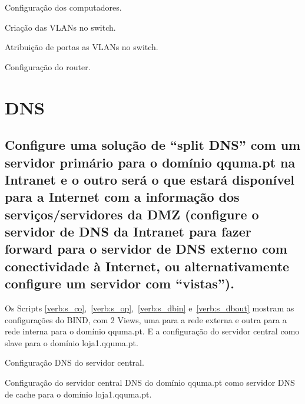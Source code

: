 \documentclass[a4paper,12pt]{article}
\begin{document}
\begin{program}
   
   \caption{Configuração dos computadores.}
   \label{verb:gnus}
\end{program}

\begin{program}
   
   \caption{Criação das VLANs no switch.}
   \label{verb:swicth_vlan}
\end{program}

\begin{program}
   
   \caption{Atribuição de portas as VLANs no switch.}
   \label{verb:switch_ports}
\end{program}

\begin{program}
   
   \caption{Configuração do router.}
   \label{verb:router}
\end{program}

\section{DNS}
\subsection{Configure uma solução de “split DNS” com um servidor primário para o
domínio qquma.pt na Intranet e o outro será o que estará disponível para a
Internet com a informação dos serviços/servidores da DMZ (configure o
servidor de DNS da Intranet para fazer forward para o servidor de DNS
externo com conectividade à Internet, ou alternativamente configure um
servidor com “vistas”).}

Os Scripts \ref{verb:s_co},~\ref{verb:s_op},~\ref{verb:s_dbin} e~\ref{verb:s_dbout}
mostram as configurações do BIND, com 2 Views, uma para a rede externa e outra para a rede interna para o domínio qquma.pt. E a configuração do servidor central como slave para o domínio loja1.qquma.pt.

\begin{program}
   
   \caption{Configuração DNS do servidor central.}
   \label{verb:s_co}
\end{program}

\begin{program}
   
   \caption{Configuração do servidor central DNS do domínio qquma.pt como servidor DNS de cache para o domínio loja1.qquma.pt.}
   \label{verb:s_op}
\end{program}
\end{document}
